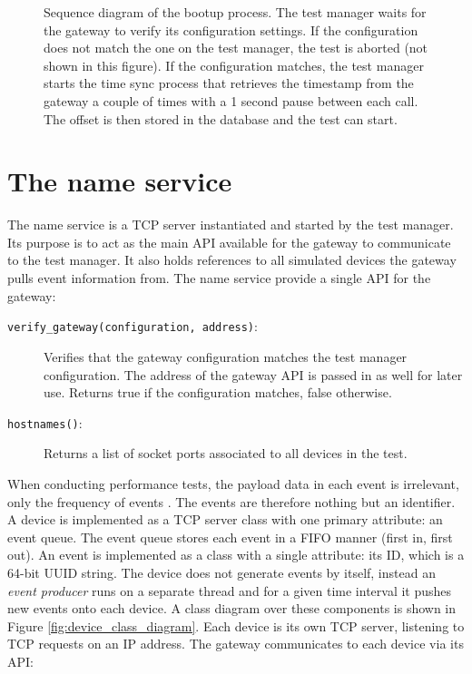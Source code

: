 \begin{figure}[h!]
    \caption{Sequence diagram of the bootup process. The test manager waits for
    the gateway to verify its configuration settings. If the configuration does
    not match the one on the test manager, the test is aborted (not shown in
    this figure). If the configuration matches, the test manager starts the
    time sync process that retrieves the timestamp from the gateway a couple of
    times with a 1 second pause between each call. The offset is then stored in
    the database and the test can start.}
    \label{fig:bootup_process}
\end{figure}

\section{The name service}

The name service is a TCP server instantiated and started by the test manager.
Its purpose is to act as the main API available for the gateway to communicate
to the test manager. It also holds references to all simulated devices the
gateway pulls event information from. The name service provide a single API for
the gateway:

\begin{description}

    \item[\texttt{verify\_gateway(configuration, address)}:] Verifies that the
        gateway configuration matches the test manager configuration. The
        address of the gateway API is passed in as well for later use. Returns
        true if the configuration matches, false otherwise.

    \item[\texttt{hostnames()}:] Returns a list of socket ports associated to
        all devices in the test.

\end{description}

When conducting performance tests, the payload data in each event is
irrelevant, only the frequency of events \cite{weyuker2000experience}. The
events are therefore nothing but an identifier. A device is implemented as a
TCP server class with one primary attribute: an event queue. The event queue
stores each event in a FIFO manner (first in, first out). An event is
implemented as a class with a single attribute: its ID, which is a 64-bit UUID
string. The device does not generate events by itself, instead an \textit{event
producer} runs on a separate thread and for a given time interval it pushes new
events onto each device. A class diagram over these components is shown in
Figure \ref{fig:device_class_diagram}. Each device is its own TCP server,
listening to TCP requests on an IP address. The gateway communicates to each
device via its API:

